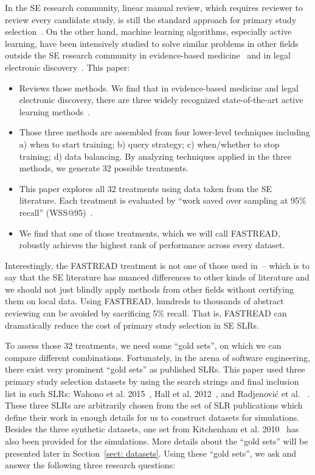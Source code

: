 \documentclass{svjour3}
\theoremstyle{break}
\begin{document}
In the SE research community, linear manual review, which requires reviewer to review every candidate study, is still the standard approach for primary study selection~\cite{kitchenham2013systematic}. On the other hand, machine learning algorithms, especially active learning, have been intensively studied to solve similar problems in other fields outside the SE research community in evidence-based medicine~\cite{paynter2016epc,wallace2010semi,wallace2010active} and in
legal electronic discovery~\cite{cormack2014evaluation,cormack2015autonomy}. This paper:
\begin{itemize}
\item
Reviews those methods. We find that in evidence-based medicine and legal electronic discovery, there are three widely recognized state-of-the-art active learning methods~\cite{cormack2014evaluation,wallace2010semi,miwa2014reducing}.
\item
Those three methods are assembled from four lower-level techniques including a) when to start training; b) query strategy; c) when/whether to stop training; d) data balancing. By analyzing techniques applied in the three methods, we generate 32 possible treatments.
\item
This paper explores all 32 treatments using data taken from the SE literature. Each treatment is evaluated by ``work saved over sampling at 95\% recall'' (WSS@95)~\cite{cohen2011performance}. 
\item
We find that one of those treatments, which we will call FASTREAD, robustly achieves the highest rank of performance across every dataset.
\end{itemize}
Interestingly, the FASTREAD treatment is not one of those used
in~\cite{cormack2014evaluation,wallace2010semi,miwa2014reducing}-- which is to say that the SE literature has nuanced differences to other kinds of literature and we should not just blindly
apply methods from other fields without certifying them on local data.
Using FASTREAD, hundreds to thousands of abstract reviewing can be avoided by sacrificing 5\% recall. That is, FASTREAD can dramatically reduce the cost of primary study selection in SE SLRs.

To assess those 32 treatments,
we need some ``gold sets'',
on which we can compare different combinations. Fortunately, in the arena of software engineering, there exist very prominent ``gold sets'' as published SLRs. This paper used three  primary study selection datasets by using the search strings and final inclusion list in such SLRs: Wahono et al. 2015~\cite{wahono2015systematic}, Hall et
al. 2012~\cite{hall2012systematic}, and Radjenovi{\'c} et al. ~\cite{radjenovic2013software}. These three SLRs are arbitrarily chosen from the set of SLR publications which define their work in enough details for us to construct datasets for simulations. Besides the three synthetic datasets, one set from Kitchenham et al. 2010~\cite{kitchenham2010systematic} has also been provided for the simulations. More details about the ``gold
sets'' will be presented later in Section~\ref{sect: datasets}. Using
these ``gold sets'', we ask and answer the following three research questions:
\end{document}
